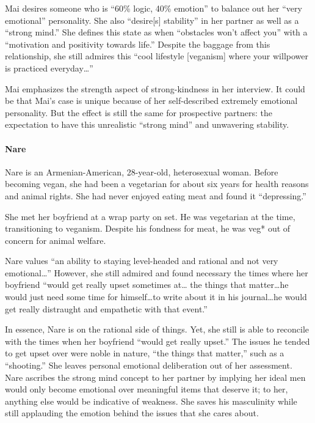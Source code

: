 \documentclass[twoside]{report}
\begin{document}
\begin{multicols}{2}
Mai desires someone who is ``60\% logic, 40\% emotion'' to balance out
her ``very emotional'' personality. She also ``desire{[}s{]} stability''
in her partner as well as a ``strong mind.'' She defines this state as
when ``obstacles won't affect you'' with a ``motivation and positivity
towards life.'' Despite the baggage from this relationship, she still
admires this ``cool lifestyle {[}veganism{]} where your willpower is
practiced everyday\ldots''

Mai emphasizes the strength aspect of strong-kindness in her interview.
It could be that Mai's case is unique because of her self-described
extremely emotional personality. But the effect is still the same for
prospective partners: the expectation to have this unrealistic ``strong
mind'' and unwavering stability.

\paragraph{Nare}

Nare is an Armenian-American, 28-year-old, heterosexual woman. Before
becoming vegan, she had been a vegetarian for about six years for health reasons and animal rights. She had
never enjoyed eating meat and found it ``depressing.''

She met her boyfriend at a wrap party on set. He was vegetarian at the time, transitioning to veganism. Despite his fondness for meat, he was veg* out of concern for animal welfare.

Nare values ``an ability to staying level-headed and rational and not
very emotional\ldots'' However, she still admired and found necessary
the times where her boyfriend ``would get really upset sometimes at\dots
the things that matter\dots he would just need some time for himself\dots to
write about it in his journal\dots he would get really distraught and
empathetic with that event.''

In essence, Nare is on the rational side of things. Yet, she still is
able to reconcile with the times when her boyfriend ``would get really
upset.'' The issues he tended to get upset over were noble in nature,
``the things that matter,'' such as a ``shooting.'' She leaves personal
emotional deliberation out of her assessment. Nare ascribes the strong
mind concept to her partner by implying her ideal men would only become
emotional over meaningful items that deserve it; to her, anything else
would be indicative of weakness. She saves his masculinity while still applauding the emotion behind the issues that she cares about.


\end{multicols}
\end{document}
